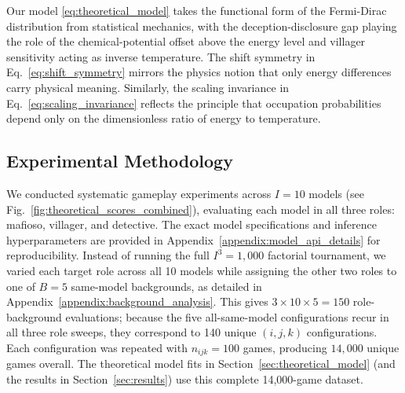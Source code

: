 \documentclass[sigconf,anonymous,balance=false]{aamas}
\begin{document}
Our model \eqref{eq:theoretical_model} takes the functional form of the Fermi-Dirac distribution from statistical mechanics, with the deception-disclosure gap playing the role of the chemical-potential offset above the energy level and villager sensitivity acting as inverse temperature. The shift symmetry in Eq.~\eqref{eq:shift_symmetry} mirrors the physics notion that only energy differences carry physical meaning. Similarly, the scaling invariance in Eq.~\eqref{eq:scaling_invariance} reflects the principle that occupation probabilities depend only on the dimensionless ratio of energy to temperature.

\subsection{Experimental Methodology}
\label{sec:experimental_methodology}

We conducted systematic gameplay experiments across $I=10$ models (see Fig.~\ref{fig:theoretical_scores_combined}), evaluating each model in all three roles: mafioso, villager, and detective. The exact model specifications and inference hyperparameters are provided in Appendix~\ref{appendix:model_api_details} for reproducibility. Instead of running the full $I^3=1{,}000$ factorial tournament, we varied each target role across all 10 models while assigning the other two roles to one of $B=5$ same-model backgrounds, as detailed in Appendix~\ref{appendix:background_analysis}. This gives $3\times10\times5=150$ role-background evaluations; because the five all-same-model configurations recur in all three role sweeps, they correspond to 140 unique $(i,j,k)$ configurations. Each configuration was repeated with $n_{ijk}=100$ games, producing $14{,}000$ unique games overall. The theoretical model fits in Section~\ref{sec:theoretical_model} (and the results in Section~\ref{sec:results}) use this complete 14,000-game dataset.
\end{document}
